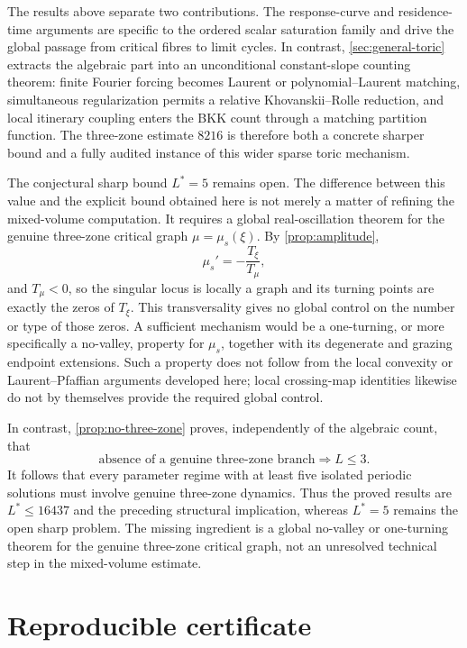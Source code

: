 \documentclass[11pt]{article}
\begin{document}
The results above separate two contributions.  The response-curve and residence-time arguments are specific to the ordered scalar saturation family and drive the global passage from critical fibres to limit cycles.  In contrast, \cref{sec:general-toric} extracts the algebraic part into an unconditional constant-slope counting theorem: finite Fourier forcing becomes Laurent or polynomial--Laurent matching, simultaneous regularization permits a relative Khovanskii--Rolle reduction, and local itinerary coupling enters the BKK count through a matching partition function.  The three-zone estimate \(8216\) is therefore both a concrete sharper bound and a fully audited instance of this wider sparse toric mechanism.

The conjectural sharp bound \(L^*=5\) remains open.  The difference between
this value and the explicit bound obtained here is not merely a matter of
refining the mixed-volume computation.  It requires a global real-oscillation
theorem for the genuine three-zone critical graph
\(\mu=\mu_s(\xi)\).  By \cref{prop:amplitude},
\[
 \mu_s'=-\frac{T_\xi}{T_\mu},
\]
and \(T_\mu<0\), so the singular locus is locally a graph and its turning
points are exactly the zeros of \(T_\xi\).  This transversality gives no global
control on the number or type of those zeros.  A sufficient mechanism would
be a one-turning, or more specifically a no-valley, property for
\(\mu_s\), together with its degenerate and grazing endpoint extensions.
Such a property does not follow from the local convexity or
Laurent--Pfaffian arguments developed here; local crossing-map identities
likewise do not by themselves provide the required global control.

In contrast, \cref{prop:no-three-zone} proves, independently of the algebraic
count, that
\[
 \text{absence of a genuine three-zone branch}\Longrightarrow L\le3.
\]
It follows that every parameter regime with at least five isolated periodic
solutions must involve genuine three-zone dynamics.  Thus the proved results
are \(L^*\le16437\) and the preceding structural implication, whereas
\(L^*=5\) remains the open sharp problem.  The missing ingredient is a global
no-valley or one-turning theorem for the genuine three-zone critical graph,
not an unresolved technical step in the mixed-volume estimate.

\section{Reproducible certificate}\label{sec:certificate}
\end{document}
